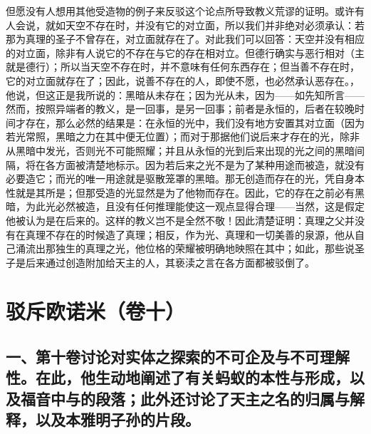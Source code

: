 但愿没有人想用其他受造物的例子来反驳这个论点所导致教义荒谬的证明。或许有人会说，就如天空不存在时，并没有它的对立面，所以我们并非绝对必须承认：若那为真理的圣子不曾存在，对立面就存在了。对此我们可以回答：天空并没有相应的对立面，除非有人说它的不存在与它的存在相对立。但德行确实与恶行相对（主就是德行）；所以当天空不存在时，并不意味有任何东西存在；但当善不存在时，它的对立面就存在了；因此，说善不存在的人，即使不愿，也必然承认恶存在。，他说，但这正是我所说的：黑暗从未存在；因为光从未，因为——如先知所言——然而，按照异端者的教义，是一回事，是另一回事；前者是永恒的，后者在较晚时间才存在，那么必然的结果是：在永恒的光中，我们没有地方安置其对立面（因为若光常照，黑暗之力在其中便无位置）；而对于那据他们说后来才存在的光，除非从黑暗中发光，否则光不可能照耀；并且从永恒的光到后来出现的光之间的黑暗间隔，将在各方面被清楚地标示。因为若后来之光不是为了某种用途而被造，就没有必要造它；而光的唯一用途就是驱散笼罩的黑暗。那无创造而存在的光，凭自身本性就是其所是；但那受造的光显然是为了他物而存在。因此，它的存在之前必有黑暗，为此光必然被造，且没有任何推理能使这一观点显得合理——当然，这是假定他被认为是在后来的。这样的教义岂不是全然不敬！因此清楚证明：真理之父并没有在真理不存在的时候造了真理；相反，作为光、真理和一切美善的泉源，他从自己涌流出那独生的真理之光，他位格的荣耀被明确地映照在其中；如此，那些说圣子是后来通过创造附加给天主的人，其亵渎之言在各方面都被驳倒了。\par



\section{驳斥欧诺米（卷十）}


\subsection{一、第十卷讨论对实体之探索的不可企及与不可理解性。在此，他生动地阐述了有关蚂蚁的本性与形成，以及福音中与的段落；此外还讨论了天主之名的归属与解释，以及本雅明子孙的片段。}

